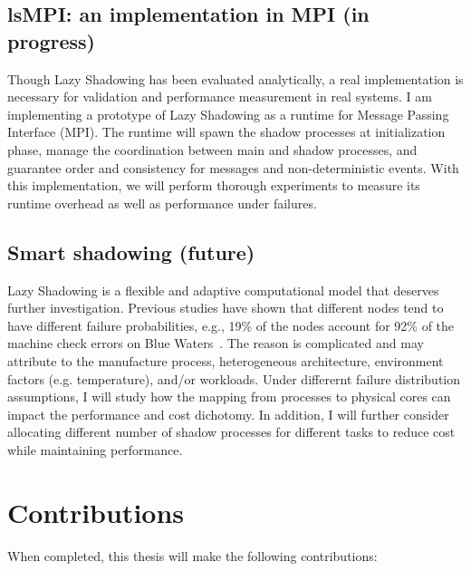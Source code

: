 \subsection{lsMPI: an implementation in MPI (in progress)}

Though Lazy Shadowing has been evaluated analytically, a real implementation 
is necessary for validation and performance measurement in real systems. I am implementing a prototype of Lazy 
Shadowing as a runtime for Message Passing Interface (MPI). %
The runtime will spawn 
the shadow processes at initialization phase, manage the coordination between main and shadow processes, 
and guarantee order and consistency for messages and non-deterministic events. With this implementation, we will perform thorough 
experiments to measure its runtime overhead as well as performance under failures.

\subsection{Smart shadowing (future)}
Lazy Shadowing is a flexible and adaptive computational model that deserves further investigation. Previous studies have shown that 
different nodes tend to have different failure probabilities, e.g., 19\% of the nodes account for 92\% of the machine check errors on Blue Waters~\cite{di2014lessons}. The reason 
is complicated and may attribute to the manufacture process, heterogeneous architecture, environment factors (e.g. temperature), 
and/or workloads. %
Under differernt failure distribution assumptions, I will study how the mapping from processes to physical cores can impact the performance and cost dichotomy. 
In addition, I will further consider allocating different number of shadow processes for different tasks to reduce cost while 
maintaining performance. 

\section{Contributions}
When completed, this thesis will make the following contributions:

